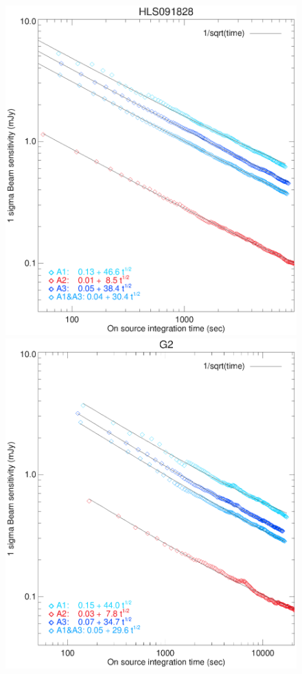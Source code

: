 \begin{figure}
\begin{center}
\includegraphics[clip, angle=0, scale =0.42]{Figures/hls_nefd_vst.eps}
\includegraphics[clip, angle=0, scale =0.42]{Figures/g2_nefd_vst.eps}

\end{center}
\end{figure}

